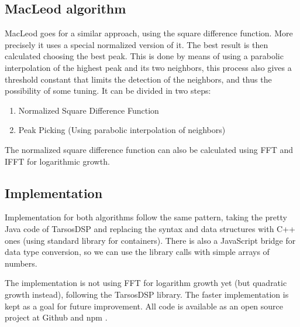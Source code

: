 \subsection{MacLeod algorithm}
MacLeod \cite{MacLeodArticle} goes for a similar approach, using the square difference
function. More precisely it uses a special normalized version of it. The best result
is then calculated choosing the best peak. This is done by means of using a parabolic
interpolation of the highest peak and its two neighbors, this process also gives a
threshold constant that limits the detection of the neighbors, and thus the possibility of some tuning.
It can be divided in two steps:

\begin{enumerate}
  \item Normalized Square Difference Function
  \item Peak Picking (Using parabolic interpolation of neighbors)
\end{enumerate}

The normalized square difference function can also be calculated using FFT and IFFT
for logarithmic growth.

\subsection{Implementation}
\label{pitch-detection-implementation}
Implementation for both algorithms follow the same pattern, taking the pretty
Java code of TarsosDSP \cite{TarsosDSP} and replacing the syntax and data structures
with C++ ones (using standard library for containers). There is also a JavaScript bridge
for data type conversion, so we can use the library calls with simple arrays of numbers.

The implementation is not using FFT for logarithm growth yet (but quadratic growth
instead), following the TarsosDSP library. The faster implementation is kept as
a goal for future improvement. All code is available as an open source project at
Github and npm \cite{node-pitchfinder}.
